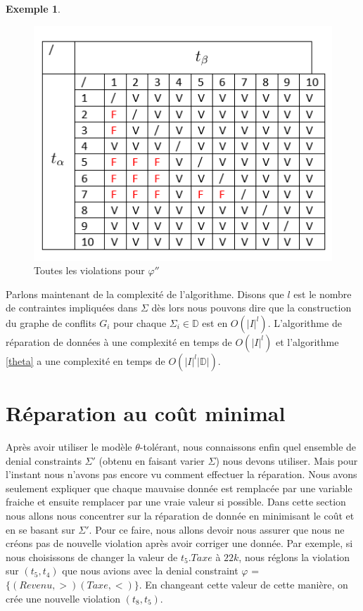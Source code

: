 \documentclass[letterpaper, 12pt]{report}
\theoremstyle{definition}
\newtheorem{myexample}{Exemple}
\begin{document}
\begin{myexample}
\begin{figure}
\centering
\includegraphics[scale=1]{img/TaxEqual}
\caption{\label{EqualTax} Toutes les violations pour $\varphi''$}
\end{figure}

\end{myexample}

Parlons maintenant de la complexité de l'algorithme. Disons que $l$ est le nombre de contraintes impliquées dans $\Sigma$ dès lors nous pouvons dire que la construction du graphe de conflits $G_i$ pour chaque $\Sigma_i \in \mathbb{D}$ est en $O(|I|^l)$. L'algorithme de réparation de données à une complexité en temps de $O(|I|^l)$ et l'algorithme \ref{theta} a une complexité en temps de $O(|I|^l|\mathbb{D}|)$. 

\section{Réparation au coût minimal}

Après avoir utiliser le modèle $\theta$-tolérant, nous connaissons enfin quel ensemble de denial constraints $\Sigma'$ (obtenu en faisant varier $\Sigma$) nous devons utiliser. Mais pour l'instant nous n'avons pas encore vu comment effectuer la réparation. Nous avons seulement expliquer que chaque mauvaise donnée est remplacée par une variable fraiche et ensuite remplacer par une vraie valeur si possible. Dans cette section nous allons nous concentrer sur la réparation de donnée en minimisant le coût et en se basant sur $\Sigma'$. Pour ce faire, nous allons devoir nous assurer que nous ne créons pas de nouvelle violation après avoir corriger une donnée. Par exemple, si nous choisissons de changer la valeur de $t_5.Taxe$ à $22k$, nous réglons la violation sur $(t_5,t_4)$ que nous avions avec la denial constraint $\varphi$ = $\{ (Revenu,>)(Taxe,<)\} $. En changeant cette valeur de cette manière, on crée une nouvelle violation $(t_8,t_5)$.\\
\end{document}
